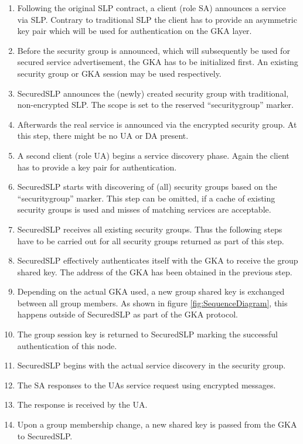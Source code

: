 \begin{enumerate}[label=\arabic{*}:]
  \item Following the original SLP contract, a client (role SA) announces a
  service via SLP. Contrary to traditional SLP the client has to provide an
  asymmetric key pair which will be used for authentication on the GKA layer.
  \item Before the security group is announced, which will subsequently be used for secured service advertisement, the GKA has to be
  initialized first. An existing security group or GKA session may be used
  respectively.
  \item SecuredSLP announces the (newly) created security group with
  traditional, non-encrypted SLP. The scope is set to the reserved
  ``securitygroup'' marker.
  \item Afterwards the real service is announced via the encrypted security
  group. At this step, there might be no UA or DA present.
  \item A second client (role UA) begins a service discovery phase. Again the
  client has to provide a key pair for authentication.
  \item SecuredSLP starts with discovering of (all) security groups based on
  the ``securitygroup'' marker. This step can be omitted, if a cache of
  existing security groups is used and misses of matching services are
  acceptable.
  \item SecuredSLP receives all existing security groups. Thus the following
  steps have to be carried out for all security groups returned as part of this
  step.
  \item SecuredSLP effectively authenticates itself with the GKA to receive
  the group shared key. The address of the GKA has been obtained in the previous
  step.
  \item Depending on the actual GKA used, a new group shared key is exchanged
  between all group members. As shown in figure \ref{fig:SequenceDiagram}, this
  happens outside of SecuredSLP as part of the GKA protocol.
  \item The group session key is returned to SecuredSLP marking the successful
  authentication of this node.
  \item SecuredSLP begins with the actual service discovery in the security
  group.
  \item The SA responses to the UAs service request using encrypted messages.
  \item The response is received by the UA.
  \item Upon a group membership change, a new shared key is passed from the GKA
  to SecuredSLP.
\end{enumerate}
